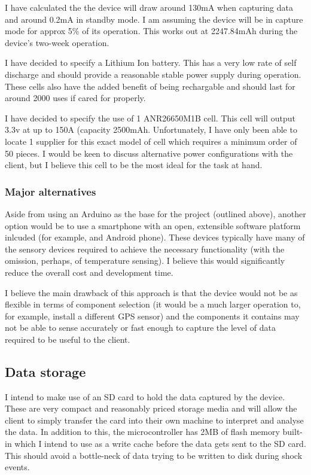 \documentclass[a4paper, twoside]{article}
\begin{document}
I have calculated the the device will draw around 130mA when capturing data and
around 0.2mA in standby mode. I am assuming the device will be in capture mode
for approx 5\% of its operation. This works out at 2247.84mAh during the
device's two-week operation.

I have decided to specify a Lithium Ion battery. This has a very low rate of
self discharge and should provide a reasonable stable power supply during
operation. These cells also have the added benefit of being rechargable and
should last for around 2000 uses if cared for properly.

I have decided to specify the use of 1 ANR26650M1B cell. This cell will output
3.3v at up to 150A (capacity 2500mAh. Unfortunately, I have only been able to
locate 1 supplier for this exact model of cell which requires a minimum order of
50 pieces. I would be keen to discuss alternative power configurations with the
client, but I believe this cell to be the most ideal for the task at hand.

\subsubsection{Major alternatives}
Aside from using an Arduino as the base for the project (outlined above),
another option would be to use a smartphone with an open, extensible software
platform inlcuded (for example, and Android phone). These devices typically have
many of the sensory devices required to achieve the necessary functionality
(with the omission, perhaps, of temperature sensing). I believe this would
significantly reduce the overall cost and development time.

I believe the main drawback of this approach is that the device would not be as
flexible in terms of component selection (it would be a much larger operation
to, for example, install a different GPS sensor) and the components it contains
may not be able to sense accurately or fast enough to capture the level of data
required to be useful to the client.

\subsection{Data storage}
I intend to make use of an SD card to hold the data captured by the device.
These are very compact and reasonably priced storage media and will allow the
client to simply transfer the card into their own machine to interpret and
analyse the data. In addition to this, the microcontroller has 2MB of flash
memory built-in which I intend to use as a write cache before the data gets sent
to the SD card. This should avoid a bottle-neck of data trying to be written to
disk during shock events.
\end{document}
